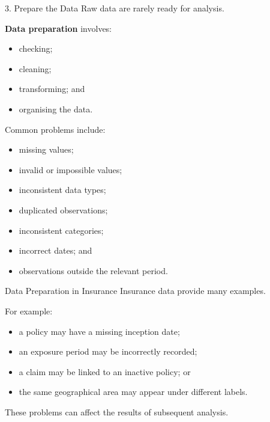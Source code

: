 \documentclass[
  ignorenonframetext,
  aspectratio=169,
]{beamer}
\providecommand{\tightlist}{%
  \setlength{\itemsep}{0pt}\setlength{\parskip}{0pt}}
\begin{document}
\begin{frame}{3. Prepare the Data}
\protect{}\label{prepare-the-data}
Raw data are rarely ready for analysis.

\textbf{Data preparation} involves:

\begin{itemize}
\tightlist
\item
  checking;
\item
  cleaning;
\item
  transforming; and
\item
  organising the data.
\end{itemize}

Common problems include:

\begin{itemize}
\tightlist
\item
  missing values;
\item
  invalid or impossible values;
\item
  inconsistent data types;
\item
  duplicated observations;
\item
  inconsistent categories;
\item
  incorrect dates; and
\item
  observations outside the relevant period.
\end{itemize}
\end{frame}

\begin{frame}{Data Preparation in Insurance}
\protect{}\label{data-preparation-in-insurance}
Insurance data provide many examples.

For example:

\begin{itemize}
\tightlist
\item
  a policy may have a missing inception date;
\item
  an exposure period may be incorrectly recorded;
\item
  a claim may be linked to an inactive policy; or
\item
  the same geographical area may appear under different labels.
\end{itemize}

These problems can affect the results of subsequent analysis.
\end{frame}
\end{document}

